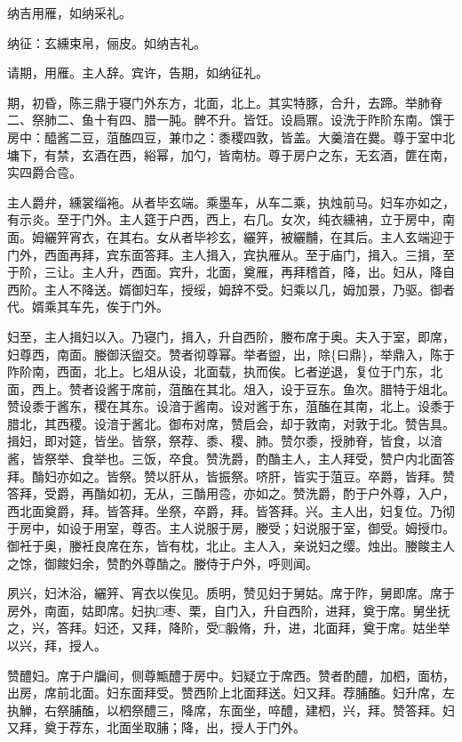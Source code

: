 \documentclass[]{article}
\begin{document}
纳吉用雁，如纳采礼。

纳征：玄纁束帛，俪皮。如纳吉礼。

请期，用雁。主人辞。宾许，告期，如纳征礼。

期，初昏，陈三鼎于寝门外东方，北面，北上。其实特豚，合升，去蹄。举肺脊二、祭肺二、鱼十有四、腊一肫。髀不升。皆饪。设扃鼏。设洗于阼阶东南。馔于房中：醯酱二豆，菹醢四豆，兼巾之：黍稷四敦，皆盖。大羹湆在爨。尊于室中北墉下，有禁，玄酒在西，綌幂，加勺，皆南枋。尊于房户之东，无玄酒，篚在南，实四爵合卺。

主人爵弁，纁裳缁袘。从者毕玄端。乘墨车，从车二乘，执烛前马。妇车亦如之，有示炎。至于门外。主人筵于户西，西上，右几。女次，纯衣纁袡，立于房中，南面。姆纚笄宵衣，在其右。女从者毕袗玄，纚笄，被纚黼，在其后。主人玄端迎于门外，西面再拜，宾东面答拜。主人揖入，宾执雁从。至于庙门，揖入。三揖，至于阶，三让。主人升，西面。宾升，北面，奠雁，再拜稽首，降，出。妇从，降自西阶。主人不降送。婿御妇车，授绥，姆辞不受。妇乘以几，姆加景，乃驱。御者代。婿乘其车先，俟于门外。

妇至，主人揖妇以入。乃寝门，揖入，升自西阶，媵布席于奥。夫入于室，即席，妇尊西，南面。媵御沃盥交。赞者彻尊幂。举者盥，出，除\{曰鼎\}，举鼎入，陈于阼阶南，西面，北上。匕俎从设，北面载，执而俟。匕者逆退，复位于门东，北面，西上。赞者设酱于席前，菹醢在其北。俎入，设于豆东。鱼次。腊特于俎北。赞设黍于酱东，稷在其东。设湆于酱南。设对酱于东，菹醢在其南，北上。设黍于腊北，其西稷。设湆于酱北。御布对席，赞启会，却于敦南，对敦于北。赞告具。揖妇，即对筵，皆坐。皆祭，祭荐、黍、稷、肺。赞尔黍，授肺脊，皆食，以湆酱，皆祭举、食举也。三饭，卒食。赞洗爵，酌酳主人，主人拜受，赞户内北面答拜。酳妇亦如之。皆祭。赞以肝从，皆振祭。哜肝，皆实于菹豆。卒爵，皆拜。赞答拜，受爵，再酳如初，无从，三酳用卺，亦如之。赞洗爵，酌于户外尊，入户，西北面奠爵，拜。皆答拜。坐祭，卒爵，拜。皆答拜。兴。主人出，妇复位。乃彻于房中，如设于用室，尊否。主人说服于房，媵受；妇说服于室，御受。姆授巾。御衽于奥，媵衽良席在东，皆有枕，北止。主人入，亲说妇之缨。烛出。媵餕主人之馀，御餕妇余，赞酌外尊酳之。媵侍于户外，呼则闻。

夙兴，妇沐浴，纚笄、宵衣以俟见。质明，赞见妇于舅姑。席于阼，舅即席。席于房外，南面，姑即席。妇执□枣、栗，自门入，升自西阶，进拜，奠于席。舅坐抚之，兴，答拜。妇还，又拜，降阶，受□腶脩，升，进，北面拜，奠于席。姑坐举以兴，拜，授人。

赞醴妇。席于户牖间，侧尊甒醴于房中。妇疑立于席西。赞者酌醴，加柶，面枋，出房，席前北面。妇东面拜受。赞西阶上北面拜送。妇又拜。荐脯醢。妇升席，左执觯，右祭脯醢，以柶祭醴三，降席，东面坐，啐醴，建柶，兴，拜。赞答拜。妇又拜，奠于荐东，北面坐取脯；降，出，授人于门外。
\end{document}
